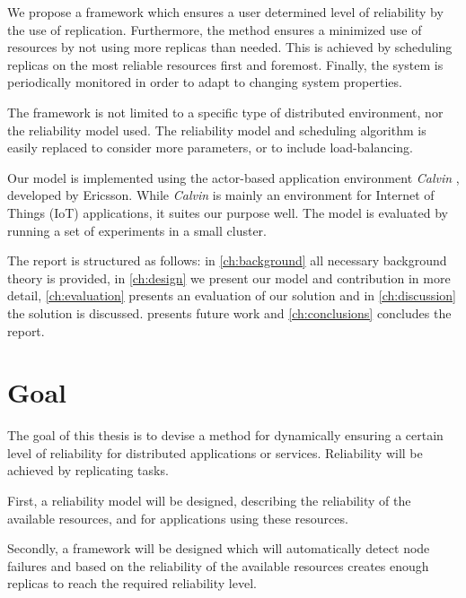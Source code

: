 \documentclass{cslthse-msc}
\begin{document}
We propose a framework which ensures a user determined level of reliability by the use of replication. Furthermore, the method ensures a minimized use of resources by not using more replicas than needed. This is achieved by scheduling replicas on the most reliable resources first and foremost. Finally, the system is periodically monitored in order to adapt to changing system properties.

The framework is not limited to a specific type of distributed environment, nor the reliability model used. The reliability model and scheduling algorithm is easily replaced to consider more parameters, or to include load-balancing.


Our model is implemented using the actor-based application environment \emph{Calvin} \cite{calvin}, developed by Ericsson. While \emph{Calvin} is mainly an environment for Internet of Things (IoT) applications, it suites our purpose well. The model is evaluated by running a set of experiments in a small cluster. %

The report is structured as follows: in \cref{ch:background} all necessary background theory is provided, in \cref{ch:design} we present our model and contribution in more detail, \cref{ch:evaluation} presents an evaluation of our solution and in \cref{ch:discussion} the solution is discussed.  presents future work and \cref{ch:conclusions} concludes the report. 

\section{Goal} \label{sec:introduction_goals}
The goal of this thesis is to devise a method for dynamically ensuring a certain level of reliability for distributed applications or services. Reliability will be achieved by replicating tasks.

First, a reliability model will be designed, describing the reliability of the available resources, and for applications using these resources.

Secondly, a framework will be designed which will automatically detect node failures and based on the reliability of the available resources creates enough replicas to reach the required reliability level.
\end{document}
